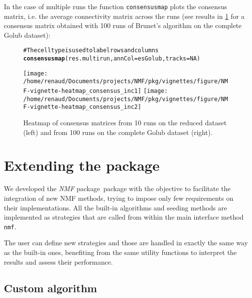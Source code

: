 \documentclass[a4paper]{article}\usepackage{graphicx, color}
\makeatletter
\newcommand{\hlfunctioncall}[1]{\textcolor[rgb]{0.501960784313725,0,0.329411764705882}{\textbf{#1}}}%
\newcommand{\hlcomment}[1]{\textcolor[rgb]{0.180392156862745,0.6,0.341176470588235}{#1}}%
\newenvironment{kframe}{%
 \def\at@end@of@kframe{}%
 \ifinner\ifhmode%
  \def\at@end@of@kframe{\end{minipage}}%
  \begin{minipage}{\columnwidth}%
 \fi\fi%
 \def\FrameCommand##1{\hskip\@totalleftmargin \hskip-\fboxsep
 \colorbox{shadecolor}{##1}\hskip-\fboxsep
     \hskip-\linewidth \hskip-\@totalleftmargin \hskip\columnwidth}%
 \MakeFramed {\advance\hsize-\width
   \@totalleftmargin\z@ \linewidth\hsize
   \@setminipage}}%
 {\par\unskip\endMakeFramed%
 \at@end@of@kframe}
\newenvironment{knitrout}{}{} %
\let\code=\texttt
\newcommand{\pkgname}[1]{\textit{#1}\xspace}
\newcommand{\Rpkg}[1]{\pkgname{#1} package\xspace}
\newcommand{\nmfpack}{\Rpkg{NMF}}
\makeatother
\begin{document}
In the case of multiple runs the function \code{consensusmap} plots the consensus matrix, i.e. the average connectivity matrix across the runs (see results in \cref{fig:heatmap_consensus} for a consensus matrix obtained with 100 runs of Brunet's algorithm on the complete 
Golub dataset):

\begin{figure}[ht]
\begin{knitrout}
\color{fgcolor}\begin{kframe}
\begin{alltt}
\hlcomment{# The cell type is used to label rows and columns}
\hlfunctioncall{consensusmap}(res.multirun, annCol = esGolub, tracks = NA)
\end{alltt}
\end{kframe}\texttt{[image: /home/renaud/Documents/projects/NMF/pkg/vignettes/figure/NMF-vignette-heatmap\_consensus\_inc1]} \texttt{[image: /home/renaud/Documents/projects/NMF/pkg/vignettes/figure/NMF-vignette-heatmap\_consensus\_inc2]} 
\end{knitrout}



\caption{Heatmap of consensus matrices from 10 runs on the reduced dataset
(left) and from 100 runs on the complete Golub dataset (right).}
\label{fig:heatmap_consensus}
\end{figure}
 
\section{Extending the package}

We developed the \nmfpack\ package with the objective to facilitate the integration of new NMF methods, trying to impose only few requirements on their implementations. 
All the built-in algorithms and seeding methods are implemented as strategies that are called from within the main interface method \code{nmf}. 

The user can define new strategies and those are handled in exactly the same way as the built-in ones, benefiting from the same utility functions to interpret the 
results and assess their performance. 

\subsection{Custom algorithm}
%
%
\end{document}

